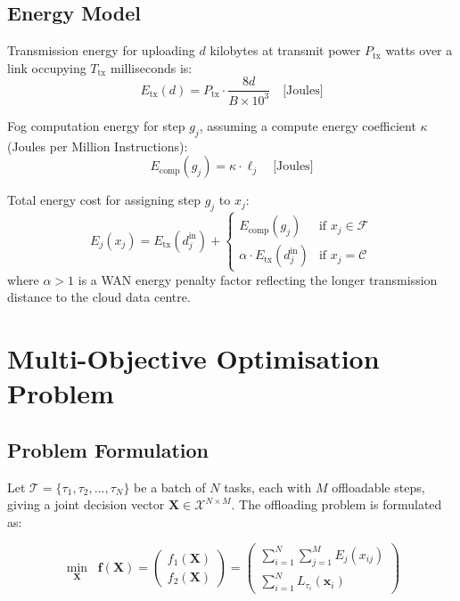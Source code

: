 \documentclass[12pt,a4paper]{article}
\theoremstyle{definition}
\theoremstyle{remark}
\begin{document}
\subsection{Energy Model}

Transmission energy for uploading $d$ kilobytes at transmit power $P_{\text{tx}}$
watts over a link occupying $T_{\text{tx}}$ milliseconds is:
\begin{equation}
  E_{\text{tx}}(d) = P_{\text{tx}} \cdot \frac{8d}{B \times 10^3}
  \quad \text{[Joules]}
  \label{eq:tx_energy}
\end{equation}

Fog computation energy for step $g_j$, assuming a compute energy coefficient
$\kappa$ (Joules per Million Instructions):
\begin{equation}
  E_{\text{comp}}(g_j) = \kappa \cdot \ell_j
  \quad \text{[Joules]}
  \label{eq:comp_energy}
\end{equation}

Total energy cost for assigning step $g_j$ to $x_j$:
\begin{equation}
  E_j(x_j) = E_{\text{tx}}(d_j^{\text{in}})
  + \begin{cases}
    E_{\text{comp}}(g_j) & \text{if } x_j \in \mathcal{F} \\
    \alpha \cdot E_{\text{tx}}(d_j^{\text{in}}) & \text{if } x_j = \mathcal{C}
  \end{cases}
  \label{eq:step_energy}
\end{equation}
where $\alpha > 1$ is a WAN energy penalty factor reflecting the longer
transmission distance to the cloud data centre.

\section{Multi-Objective Optimisation Problem}
\label{sec:problem}

\subsection{Problem Formulation}

Let $\mathcal{T} = \{\tau_1, \tau_2, \ldots, \tau_N\}$ be a batch of $N$ tasks,
each with $M$ offloadable steps, giving a joint decision vector
$\mathbf{X} \in \mathcal{X}^{N \times M}$. The offloading problem is formulated as:

\begin{equation}
  \min_{\mathbf{X}} \;\; \bm{f}(\mathbf{X}) =
  \begin{pmatrix} f_1(\mathbf{X}) \\ f_2(\mathbf{X}) \end{pmatrix} =
  \begin{pmatrix}
    \displaystyle\sum_{i=1}^{N} \sum_{j=1}^{M} E_j(x_{ij}) \\[10pt]
    \displaystyle\sum_{i=1}^{N} L_{\tau_i}(\mathbf{x}_i)
  \end{pmatrix}
  \label{eq:biobj}
\end{equation}
\end{document}
